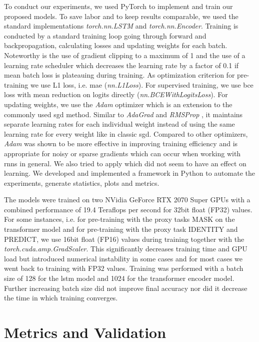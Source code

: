 To conduct our experiments, we used PyTorch \cite{pytorch} to implement and train our proposed models. To save labor and to keep results comparable, we used the standard implementations \textit{torch.nn.LSTM} and \textit{torch.nn.Encoder}. Training is conducted by a standard training loop going through forward and backpropagation, calculating losses and updating weights for each batch. Noteworthy is the use of gradient clipping to a maximum of 1 and the use of a learning rate scheduler which decreases the learning rate by a factor of 0.1 if mean batch loss is plateauing during training. As optimization criterion for pre-training we use L1 loss, i.e. \gls{mae} (\textit{nn.L1Loss}). For supervised training, we use \gls{bce} loss with mean reduction on logits directly (\textit{nn.BCEWithLogitsLoss}).
For updating weights, we use the \textit{Adam} optimizer \cite{adam} which is an extension to the commonly used \gls{sgd} method. Similar to \textit{AdaGrad} \cite{optimizer_comparison} and \textit{RMSProp} \cite{optimizer_comparison}, it maintains separate learning rates for each individual weight instead of using the same learning rate for every weight like in classic \gls{sgd}. Compared to other optimizers, \textit{Adam} was shown to be more effective in improving training efficiency \cite{adam} and is appropriate for noisy or sparse gradients which can occur when working with \glspl{rnn} in general. We also tried to apply \cite{AdamW} which did not seem to have an effect on learning.
We developed and implemented a framework in Python to automate the experiments, generate statistics, plots and metrics. \par
The models were trained on two NVidia GeForce RTX 2070 Super GPUs with a combined performance of 19.4 Teraflops per second for 32bit float (FP32) values. For some instances, i.e. for pre-training with the proxy tasks MASK on the transformer model and for pre-training with the proxy task IDENTITY and PREDICT, we use 16bit float (FP16) values during training together with the \textit{torch.cuda.amp.GradScaler}. This significantly decreases training time and GPU load but introduced numerical instability in some cases and for most cases we went back to training with FP32 values. Training was performed with a batch size of 128 for the \gls{lstm} model and 1024 for the transformer encoder model. Further increasing batch size did not improve final accuracy nor did it decrease the time in which training converges. \par

\section{Metrics and Validation}

